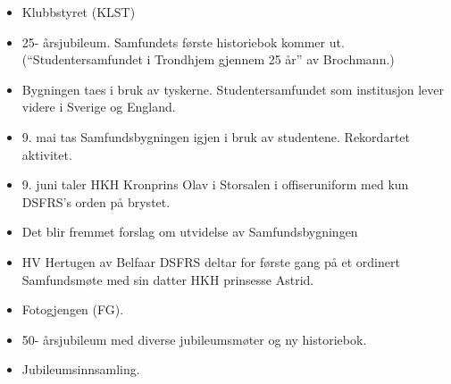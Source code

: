 
\begin{itemize}
  \item Klubbstyret (KLST)
\end{itemize}


\begin{itemize}
  \item 25- årsjubileum. Samfundets første historiebok kommer ut. (``Studentersamfundet i Trondhjem gjennem 25 år'' av
Brochmann.)
\end{itemize}


\begin{itemize}
  \item Bygningen taes i bruk av tyskerne. Studentersamfundet som institusjon lever videre i Sverige og England.
\end{itemize}


\begin{itemize}
  \item 9. mai tas Samfundsbygningen igjen i bruk av studentene. Rekordartet aktivitet.
  \item 9. juni taler HKH Kronprins Olav i Storsalen i offiseruniform med kun DSFRS's orden på brystet.
\end{itemize}


\begin{itemize}
  \item Det blir fremmet forslag om utvidelse av Samfundsbygningen
\end{itemize}


\begin{itemize}
  \item HV Hertugen av Belfaar DSFRS deltar for første gang på et ordinert Samfundsmøte med sin datter HKH
prinsesse Astrid.
\end{itemize}


\begin{itemize}
  \item Fotogjengen (FG).
\end{itemize}


\begin{itemize}
  \item 50- årsjubileum med diverse jubileumsmøter og ny historiebok.
  \item Jubileumsinnsamling.
\end{itemize}

